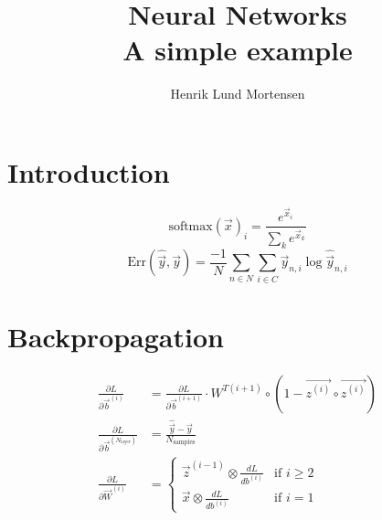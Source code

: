 \documentclass{memoir}
\title{Neural Networks \\ \small{A simple example}}
\author{Henrik Lund Mortensen}
\begin{document}
\maketitle


\section{Introduction}
\begin{equation}
  \label{softmax}
  \text{softmax}(\vec{x})_i = \frac{e^{\vec{x}_i}}{\sum_k e^{\vec{x}_k}}
\end{equation}
\begin{equation}
  \label{cross entropy}
  \text{Err}(\hat{\vec{y}},\vec{y}) = \frac{-1}{N} \sum_{n\in N} \sum_{i \in C} \vec{y}_{n,i} \log \hat{\vec{y}}_{n,i}
\end{equation}


\section{Backpropagation} 

\begin{align}
  \label{dLdb_i}
  \frac{\partial L}{\partial \vec{b}^{(i)}} &= \frac{\partial L}{\partial \vec{b}^{(i+1)}} \cdot{W}^{T(i+1)} \circ (1-\vec{z^{(i)}}\circ \vec{z^{(i)}})\\
  \frac{\partial L}{\partial \vec{b}^{(N_\text{layer})}} &= \frac{\hat{\vec{y}}-\vec{y} }{N_{\text{samples}}}\\
  \label{dLdW_i}
  \frac{\partial L}{\partial \vec{W}^{(i)}} &=
                                              \begin{cases}
                                                \vec{z}^{(i-1)} \otimes \frac{dL}{db^{(i)}} & \text{if } i \geq 2 \\
                                                \vec{x}\otimes \frac{dL}{db^{(i)}}  & \text{if } i = 1
                                              \end{cases}
\end{align}
\end{document}
